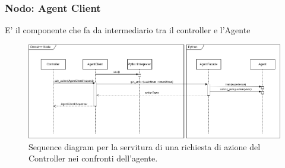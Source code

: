 \documentclass[compress]{beamer}
\begin{document}
\subsubsection*{Nodo: Agent Client}
\begin{frame}{\subsubsecname}
    E' il componente che fa da intermediario tra il controller e l'Agente

    \begin{figure}
        \centering
        \includegraphics[width=\textwidth]{figs/agentc_sequence_diagram.drawio.png}
        \caption{Sequence diagram per la servitura di una richiesta di azione del Controller nei confronti dell'agente.}
        \label{fig:agentc_sequence_diagram}
    \end{figure}
\end{frame}
\end{document}
